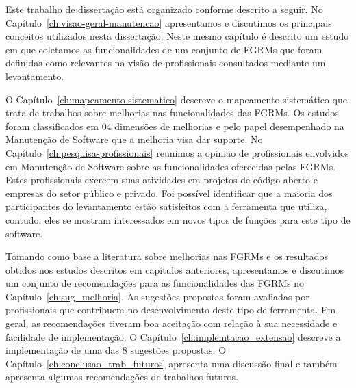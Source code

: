 Este trabalho de dissertação está organizado conforme descrito a seguir. No
Capítulo~\ref{ch:visao-geral-manutencao} apresentamos e discutimos os principais
conceitos utilizados nesta dissertação. Neste mesmo capítulo é descrito um
estudo em que coletamos as funcionalidades de um conjunto de FGRMs que foram
definidas como relevantes na visão de profissionais consultados mediante um
levantamento.

O Capítulo~\ref{ch:mapeamento-sistematico} descreve o mapeamento sistemático que
trata de trabalhos sobre melhorias nas funcionalidades das FGRMs. Os estudos
foram classificados em 04 dimensões de melhorias e pelo papel desempenhado na
Manutenção de Software que a melhoria visa dar suporte. No
Capítulo~\ref{ch:pesquisa-profissionais} reunimos a opinião de profissionais
envolvidos em Manutenção de Software sobre as funcionalidades oferecidas pelas
FGRMs. Estes profissionais exercem suas atividades em projetos de código aberto
e empresas do setor público e privado. Foi possível identificar que a maioria
dos participantes do levantamento estão satisfeitos com a ferramenta que
utiliza, contudo, eles se mostram interessados em novos tipos de funções para
este tipo de software.

Tomando como base a literatura sobre melhorias nas FGRMs e os resultados obtidos
nos estudos descritos em capítulos anteriores, apresentamos e discutimos um
conjunto de recomendações para as funcionalidades das FGRMs no
Capítulo~\ref{ch:sug_melhoria}. As sugestões propostas foram avaliadas por
profissionais que contribuem no desenvolvimento deste tipo de ferramenta. Em
geral, as recomendações tiveram boa aceitação com relação à sua necessidade e
facilidade de implementação. O Capítulo~\ref{ch:implemtacao_extensao} descreve a
implementação de uma das 8 sugestões propostas. O
Capítulo~\ref{ch:conclusao_trab_futuros} apresenta uma discussão final e também
apresenta algumas recomendações de trabalhos futuros.
